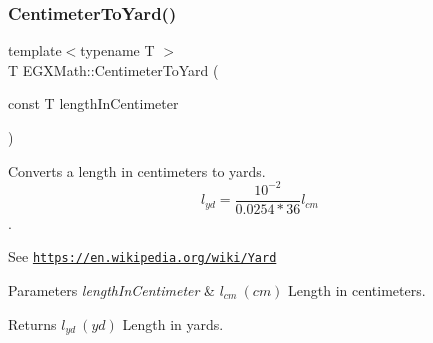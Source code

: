 \subsubsection{\texorpdfstring{Centimeter\+To\+Yard()}{CentimeterToYard()}}
{\footnotesize\ttfamily template$<$typename T $>$ \\
T E\+G\+X\+Math\+::\+Centimeter\+To\+Yard (\begin{DoxyParamCaption}\item[{const T}]{length\+In\+Centimeter }\end{DoxyParamCaption})}



Converts a length in centimeters to yards. \[ l_{yd}= \frac{10^{-2}}{0.0254 * 36} l_{cm} \]. 

See \href{https://en.wikipedia.org/wiki/Yard}{\tt https\+://en.\+wikipedia.\+org/wiki/\+Yard} 
\begin{DoxyParams}{Parameters}
{\em length\+In\+Centimeter} & $ l_{cm}\ (cm)$ Length in centimeters. \\
\hline
\end{DoxyParams}
\begin{DoxyReturn}{Returns}
$ l_{yd}\ (yd)$ Length in yards. 
\end{DoxyReturn}
